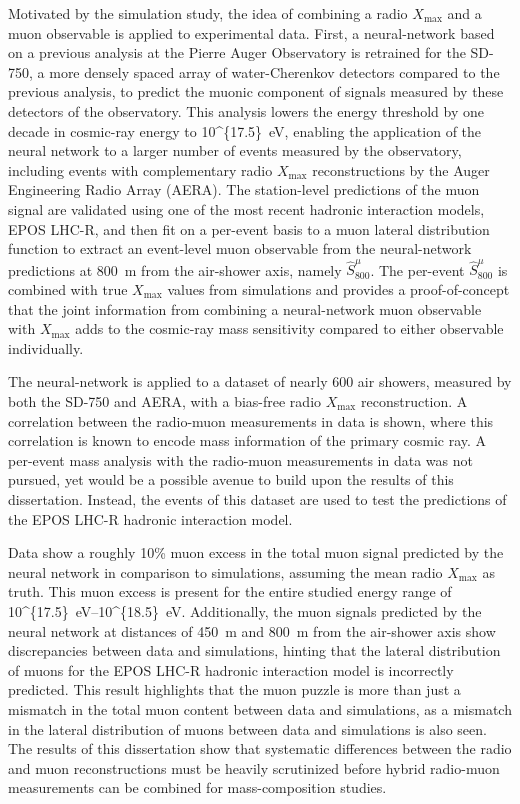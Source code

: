 Motivated by the simulation study, the idea of combining a radio $X_{\text{max}}$ and a muon observable is applied to experimental data.
First, a neural-network based on a previous analysis at the Pierre Auger Observatory is retrained for the SD-750, a more densely spaced array of water-Cherenkov detectors compared to the previous analysis, to predict the muonic component of signals measured by these detectors of the observatory.
This analysis lowers the energy threshold by one decade in cosmic-ray energy to \qty[parse-numbers=false]{10^{17.5}}{\electronvolt}, enabling the application of the neural network to a larger number of events measured by the observatory, including events with complementary radio $X_{\text{max}}$ reconstructions by the Auger Engineering Radio Array (AERA).
The station-level predictions of the muon signal are validated using one of the most recent hadronic interaction models, EPOS LHC-R, and then fit on a per-event basis to a muon lateral distribution function to extract an event-level muon observable from the neural-network predictions at \qty{800}{\meter} from the air-shower axis, namely $\hat{S}^{\mu}_{800}$.
The per-event $\hat{S}^{\mu}_{800}$ is combined with true $X_{\text{max}}$ values from simulations and provides a proof-of-concept that the joint information from combining a neural-network muon observable with $X_{\text{max}}$ adds to the cosmic-ray mass sensitivity compared to either observable individually.

The neural-network is applied to a dataset of nearly 600 air showers, measured by both the SD-750 and AERA, with a bias-free radio $X_{\text{max}}$ reconstruction.
A correlation between the radio-muon measurements in data is shown, where this correlation is known to encode mass information of the primary cosmic ray.
A per-event mass analysis with the radio-muon measurements in data was not pursued, yet would be a possible avenue to build upon the results of this dissertation.
Instead, the events of this dataset are used to test the predictions of the EPOS LHC-R hadronic interaction model.

Data show a roughly 10\% muon excess in the total muon signal predicted by the neural network in comparison to simulations, assuming the mean radio $X_{\text{max}}$ as truth.
This muon excess is present for the entire studied energy range of \qtyrange[parse-numbers=false]{10^{17.5}}{10^{18.5}}{\electronvolt}.
Additionally, the muon signals predicted by the neural network at distances of \qty{450}{\meter} and \qty{800}{\meter} from the air-shower axis show discrepancies between data and simulations, hinting that the lateral distribution of muons for the EPOS LHC-R hadronic interaction model is incorrectly predicted.
This result highlights that the muon puzzle is more than just a mismatch in the total muon content between data and simulations, as a mismatch in the lateral distribution of muons between data and simulations is also seen.
The results of this dissertation show that systematic differences between the radio and muon reconstructions must be heavily scrutinized before hybrid radio-muon measurements can be combined for mass-composition studies.

